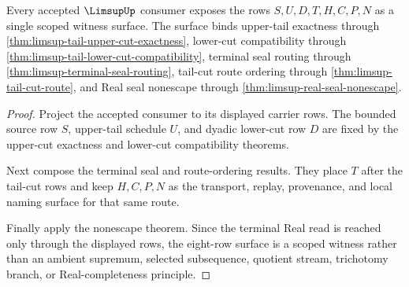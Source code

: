 \begin{theorem}
\label{thm:limsup-scoped-tail-cut-witness}
Every accepted $\LimsupUp$ consumer exposes the rows $S,U,D,T,H,C,P,N$ as a single scoped witness surface. The surface binds upper-tail exactness through \autoref{thm:limsup-tail-upper-cut-exactness}, lower-cut compatibility through \autoref{thm:limsup-tail-lower-cut-compatibility}, terminal seal routing through \autoref{thm:limsup-terminal-seal-routing}, tail-cut route ordering through \autoref{thm:limsup-tail-cut-route}, and Real seal nonescape through \autoref{thm:limsup-real-seal-nonescape}.
\end{theorem}
\begin{proof}
Project the accepted consumer to its displayed carrier rows. The bounded source row $S$, upper-tail schedule $U$, and dyadic lower-cut row $D$ are fixed by the upper-cut exactness and lower-cut compatibility theorems.

Next compose the terminal seal and route-ordering results. They place $T$ after the tail-cut rows and keep $H,C,P,N$ as the transport, replay, provenance, and local naming surface for that same route.

Finally apply the nonescape theorem. Since the terminal Real read is reached only through the displayed rows, the eight-row surface is a scoped witness rather than an ambient supremum, selected subsequence, quotient stream, trichotomy branch, or Real-completeness principle.
\end{proof}

\begin{closurestatus}{\LimsupUp}
  \theoryclosure{\scopedClosure}
  \formalstatus{\unformalizedV}
\end{closurestatus}
